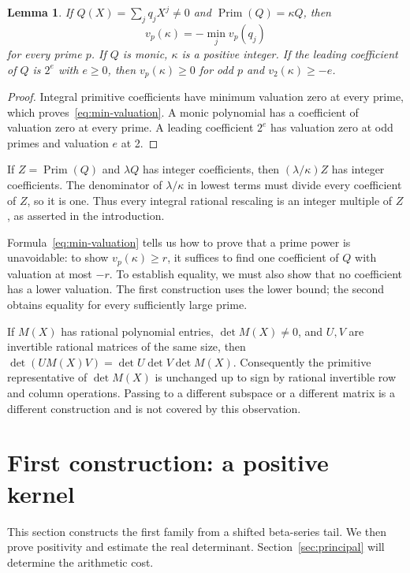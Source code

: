 \documentclass[11pt]{article}
\newtheorem{lemma}[theorem]{Lemma}
\theoremstyle{definition}
\theoremstyle{remark}
\numberwithin{equation}{section}
\newcommand{\vp}{v_p}
\newcommand{\PP}{\operatorname{Prim}}
\begin{document}
\begin{lemma}\label{lem:primitive}
If $Q(X)=\sum_j q_jX^j\ne0$ and $\PP(Q)=\kappa Q$, then
\begin{equation}\label{eq:min-valuation}
 \vp(\kappa)=-\min_j\vp(q_j)
\end{equation}
for every prime $p$. If $Q$ is monic, $\kappa$ is a positive integer.
If the leading coefficient of $Q$ is $2^e$ with $e\geq0$, then
$\vp(\kappa)\geq0$ for odd $p$ and $v_2(\kappa)\geq-e$.
\end{lemma}

\begin{proof}
Integral primitive coefficients have minimum valuation zero at every
prime, which proves~\eqref{eq:min-valuation}. A monic polynomial has a
coefficient of valuation zero at every prime. A leading coefficient $2^e$
has valuation zero at odd primes and valuation $e$ at 2.
\end{proof}

If $Z=\PP(Q)$ and $\lambda Q$ has integer coefficients, then
$(\lambda/\kappa)Z$ has integer coefficients. The denominator of
$\lambda/\kappa$ in lowest terms must divide every coefficient of $Z$,
so it is one. Thus every integral rational rescaling is an integer
multiple of $Z$, as asserted in the introduction.

Formula~\eqref{eq:min-valuation} tells us how to prove that a prime
power is unavoidable: to show $v_p(\kappa)\geq r$, it suffices to find
one coefficient of $Q$ with valuation at most $-r$. To establish equality,
we must also show that no coefficient has a lower valuation.
The first construction uses the lower bound; the second obtains
equality for every sufficiently large prime.

If $M(X)$ has rational polynomial entries, $\det M(X)\ne0$, and $U,V$
are invertible rational matrices of the same size, then
$\det(U M(X)V)=\det U\det V\det M(X)$. Consequently the primitive
representative of $\det M(X)$ is unchanged up to sign by rational invertible
row and column operations. Passing to a different subspace or a different
matrix is a different construction and is not covered by this observation.

\section{First construction: a positive kernel}\label{sec:kernel}

This section constructs the first family from a shifted beta-series
tail. We then prove positivity and estimate the real determinant.
Section~\ref{sec:principal} will determine the arithmetic cost.
\end{document}
